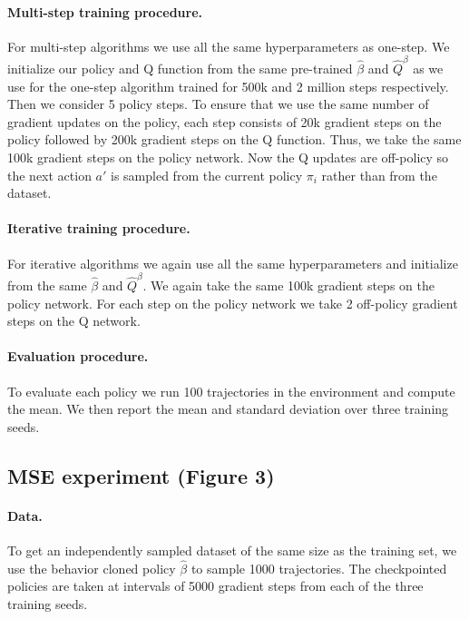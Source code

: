\paragraph{Multi-step training procedure.} For multi-step algorithms we use all the same hyperparameters as one-step. We initialize our policy and Q function from the same pre-trained $ \hat \beta$ and $ \widehat Q^\beta$ as we use for the one-step algorithm trained for 500k and 2 million steps respectively. Then we consider 5 policy steps. To ensure that we use the same number of gradient updates on the policy, each step consists of 20k gradient steps on the policy followed by 200k gradient steps on the Q function. Thus, we take the same 100k gradient steps on the policy network. Now the Q updates are off-policy so the next action $a'$ is sampled from the current policy $ \pi_i$ rather than from the dataset.

\paragraph{Iterative training procedure.} For iterative algorithms we again use all the same hyperparameters and initialize from the same $ \hat \beta$ and $ \widehat Q^\beta$. We again take the same 100k gradient steps on the policy network. For each step on the policy network we take 2 off-policy gradient steps on the Q network.



\paragraph{Evaluation procedure.} To evaluate each policy we run 100 trajectories in the environment and compute the mean. We then report the mean and standard deviation over three training seeds.




\subsection{MSE experiment (Figure 3)}

\paragraph{Data.} To get an independently sampled dataset of the same size as the training set, we use the behavior cloned policy $ \hat \beta$ to sample 1000 trajectories. The checkpointed policies are taken at intervals of 5000 gradient steps from each of the three training seeds.


